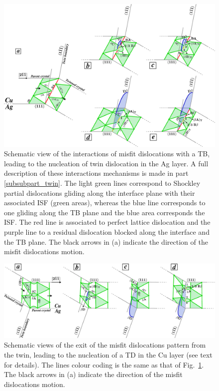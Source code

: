 \documentclass[final,3p,times,twocolumn]{elsarticle}
\begin{document}
\begin{figure}[!t]
	\begin{center}
		\includegraphics[width=160mm]{Pic/fig_ENT.eps} 
	\end{center}\caption{Schematic view of the interactions of misfit dislocations with a TB, leading to the nucleation of twin dislocation in the Ag layer. A full description of these interactions mechanisms is made in part \ref{subsubpart_twin}. The light green lines correspond to Shockley partial dislocations gliding along the interface plane with their associated ISF (green areas), whereas the blue line corresponds to one gliding along the TB plane and the blue area corresponds the ISF. The red line is associated to perfect lattice dislocation and the purple line to a residual dislocation blocked along the interface and the TB plane. The black arrows in (a) indicate the direction of the misfit dislocations motion.}\label{fig_ENT}
\end{figure}
\begin{figure}[!t]
	\begin{center}
		\includegraphics[width=160mm]{Pic/fig_SOR.eps} 
	\end{center}\caption{Schematic views of the exit of the misfit dislocations pattern from the twin, leading to the nucleation of a TD in the Cu layer (see text for details). The lines colour coding is the same as that of Fig.~\ref{fig_ENT}. The black arrows in (a) indicate the direction of the misfit dislocations motion.}\label{fig_SOR}
\end{figure}
\end{document}
